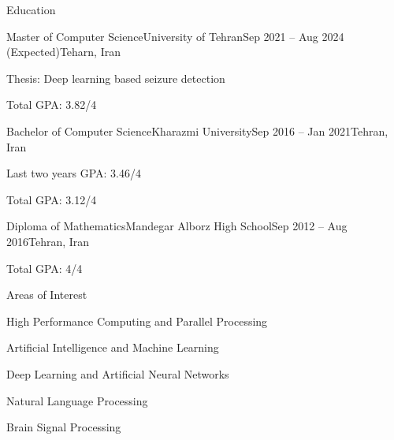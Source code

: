 \documentclass[]{main}
\begin{document}
\resumeheader
{}
{}
{}
{}
{}
{}



\begin{section}{Education}
    \begin{subsectionnobullet}{Master of Computer Science}{University of Tehran}{Sep 2021 -- Aug 2024 (Expected)}{Teharn, Iran}
        \item Thesis: Deep learning based seizure detection 
        \item Total GPA: 3.82/4 
        \end{subsectionnobullet}
\begin{subsectionnobullet}{Bachelor of Computer Science}{Kharazmi University}{Sep 2016 -- Jan 2021}{Tehran, Iran}
        \item Last two years GPA: 3.46/4 
        \item Total GPA: 3.12/4 
        \end{subsectionnobullet}
\begin{subsectionnobullet}{Diploma of Mathematics}{Mandegar Alborz High School}{Sep 2012 -- Aug 2016}{Tehran, Iran}
        \item Total GPA: 4/4 
        \end{subsectionnobullet}

\end{section}

\begin{section}{Areas of Interest}
    \begin{subsectionbullet}
        \item High Performance Computing and Parallel Processing
        \item Artificial Intelligence and Machine Learning
        \item Deep Learning and Artificial Neural Networks
        \item Natural Language Processing
        \item Brain Signal Processing
        \end{subsectionbullet}
\end{section}
\end{document}
